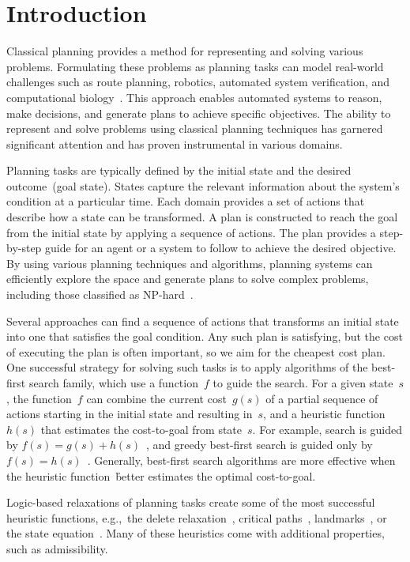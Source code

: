 \chapter{Introduction}
\label{chapter:introduction}

Classical planning provides a method for representing and solving various problems. Formulating these problems as planning tasks can model real-world challenges such as route planning, robotics, automated system verification, and computational biology~\cite{edelkamp2012heuristic}. This approach enables automated systems to reason, make decisions, and generate plans to achieve specific objectives. The ability to represent and solve problems using classical planning techniques has garnered significant attention and has proven instrumental in various domains.

Planning tasks are typically defined by the initial state and the desired outcome~(goal state). States capture the relevant information about the system's condition at a particular time. Each domain provides a set of actions that describe how a state can be transformed. A plan is constructed to reach the goal from the initial state by applying a sequence of actions. The plan provides a step-by-step guide for an agent or a system to follow to achieve the desired objective. By using various planning techniques and algorithms, planning systems can efficiently explore the space and generate plans to solve complex problems, including those classified as NP-hard~\cite{bylander1994computational}.

Several approaches can find a sequence of actions that transforms an initial state into one that satisfies the goal condition. Any such plan is satisfying, but the cost of executing the plan is often important, so we aim for the cheapest cost plan. One successful strategy for solving such tasks is to apply algorithms of the best-first search family, which use a function~$f$ to guide the search. For a given state~$s$, the function~$f$ can combine the current cost~$g(s)$ of a partial sequence of actions starting in the initial state and resulting in~$s$, and a heuristic function~$h(s)$ that estimates the cost-to-goal from state~$s$. For example, \astar search is guided by $f(s)=g(s)+h(s)$~\cite{hart1968formal}, and greedy best-first search is guided only by $f(s)=h(s)$~\cite{doran1966experiments}. Generally, best-first search algorithms are more effective when the heuristic function~\h better estimates the optimal cost-to-goal.

Logic-based relaxations of planning tasks create some of the most successful heuristic functions, e.g.,~the delete relaxation~\cite{hoffmann2001ff}, critical paths~\cite{haslum2004admissible}, landmarks~\cite{hoffmann2004ordered,karpas2009cost}, or the state equation~\cite{bonet2013admissible}. Many of these heuristics come with additional properties, such as admissibility.

